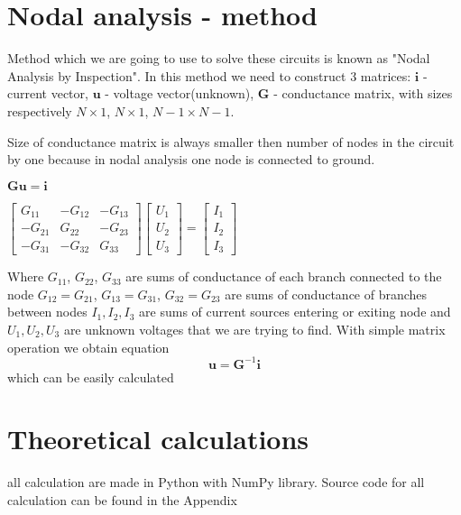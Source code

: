 \documentclass[notitlepage, a4paper, 11pt]{article}
\begin{document}
	\section{Nodal analysis - method}
	Method which we are going to use to solve these circuits is known as "Nodal Analysis by Inspection". In this method we need to construct 3 matrices: $\mathbf{i}$ - current vector, $\mathbf{u}$ - voltage vector(unknown), $\mathbf{G}$ - conductance matrix, with sizes respectively $\mathit{N} \times 1$, $\mathit{N} \times 1$, $\mathit{N}-1 \times \mathit{N}-1$.
	
	Size of conductance matrix is always smaller then number of nodes in the circuit by one because in nodal analysis one node is connected to ground.

		\begin{center} $\mathbf{Gu=i}$ \end{center}
		\begin{center}
			\begin{math}
				\begin{bmatrix}
					G_{11} & -G_{12} & -G_{13} \\
					-G_{21} & G_{22} & -G_{23} \\
					-G_{31} & -G_{32} & G_{33} 
				\end{bmatrix}
				\begin{bmatrix}
					U_1 \\
					U_2 \\ 
					U_3
				\end{bmatrix}
				=
				\begin{bmatrix}
					I_1 \\
					I_2 \\
					I_3
				\end{bmatrix}
			\end{math}
		\end{center}
		Where $G_{11}$, $G_{22}$, $G_{33}$ are sums of conductance of each branch connected to the node \newline $G_{12} = G_{21}$, $G_{13} = G_{31}$, $G_{32} = G_{23}$ are sums of conductance of branches between nodes \newline $I_1, I_2, I_3$ are sums of current sources entering or exiting node and $U_1, U_2, U_3$ are unknown voltages that we are trying to find.
		\newline\newline
		With simple matrix operation we obtain equation
		$$
		\mathbf{u} = \mathbf{G}^{-1}\mathbf{i}
		$$
		which can be easily calculated
	\section{Theoretical calculations}
	all calculation are made in Python with NumPy library. Source code for all calculation can be found in the Appendix
	
\end{document}
